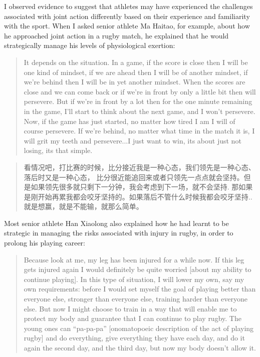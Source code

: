 \begin{CJK}{UTF8}{gbsn}

I observed evidence to suggest that athletes may have experienced the challenges associated with joint action differently based on their experience and familiarity with the sport.  When I asked senior athlete Ma Haitao, for example, about how he approached joint action in a rugby match, he explained that he would strategically manage his levels of physiological exertion:

    \begin{quote}
      It depends on the situation.  In a game, if the score is close then I will be one kind of mindset, if we are ahead then I will be of another mindset, if we're behind then I will be in yet another mindset.  When the scores are close and we can come back or if we're in front by only a little bit then will persevere.  But if we're in front by a lot then for the one minute remaining in the game, I'll start to think about the next game, and I won't persevere.  Now, if the game has just started, no matter how tired I am I will of course persevere. If we're behind, no matter what time in the match it is, I will grit my teeth and persevere...I just want to win, its about just not losing, its that simple.
    \end{quote}

    \begin{quote}
      看情况吧，打比赛的时候，比分接近我是一种心态，我们领先是一种心态、落后时又是一种心态， 比分很近能追回来或者只领先一点点就会坚持。但是如果领先很多就只剩下一分钟，我会考虑到下一场，就不会坚持.  那如果是刚开始再累我都会咬牙坚持的。如果落后不管什么时候我都会咬牙坚持..就是想赢，就是不能输，就那么简单。
    \end{quote}

Most senior athlete Han Xiaolong also explained how he had learnt to be strategic in managing the risks associated with injury in rugby, in order to prolong his playing career:

    \begin{quote}
      Because look at me, my leg has been injured for a while now.  If this leg gets injured again I would definitely be quite worried [about my ability to continue playing]. In this type of situation, I will lower my own, say my own requirements: before I would set myself the goal of playing better than everyone else, stronger than everyone else, training harder than everyone else.  But now I might choose to train in a way that will enable me to protect my body and guarantee that I can continue to play rugby.  The young ones can ``pa-pa-pa'' [onomatopoeic description of the act of playing rugby] and do everything, give everything they have each day, and do it again the second day, and the third day, but now my body doesn't allow it.
    \end{quote}


\end{CJK}
